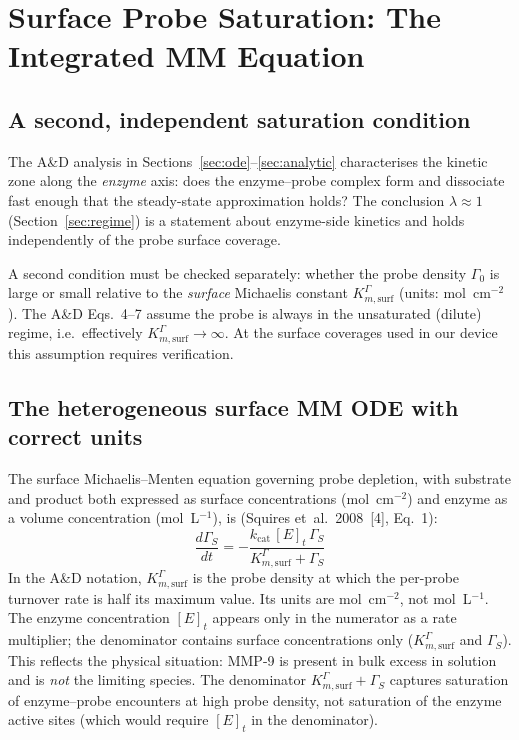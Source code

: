 \documentclass[10pt,a4paper]{article}
\numberwithin{equation}{section}
\newcommand{\cit}[1]{[#1]}
\newcommand{\kcat}{k_{\text{cat}}}
\newcommand{\GS}{\Gamma_S}
\newcommand{\Gz}{\Gamma_0}
\begin{document}
\section{Surface Probe Saturation: The Integrated MM Equation}
\label{sec:surface_sat}

\subsection{A second, independent saturation condition}

The A\&D analysis in Sections~\ref{sec:ode}--\ref{sec:analytic} characterises
the kinetic zone along the \emph{enzyme} axis: does the enzyme--probe complex
form and dissociate fast enough that the steady-state approximation holds?
The conclusion $\lambda \approx 1$ (Section~\ref{sec:regime}) is a statement
about enzyme-side kinetics and holds independently of the probe surface coverage.

A second condition must be checked separately: whether the probe density
$\Gz$ is large or small relative to the \emph{surface} Michaelis constant
$K_{m,\text{surf}}^\Gamma$ (units: mol~cm$^{-2}$). The A\&D Eqs.~4--7 assume
the probe is always in the unsaturated (dilute) regime, i.e.\ effectively
$K_{m,\text{surf}}^\Gamma \to \infty$. At the surface coverages used in our
device this assumption requires verification.

\subsection{The heterogeneous surface MM ODE with correct units}

The surface Michaelis--Menten equation governing probe depletion, with
substrate and product both expressed as surface concentrations
(mol~cm$^{-2}$) and enzyme as a volume concentration (mol~L$^{-1}$), is
(Squires et~al.\ 2008~\cit{4}, Eq.~1):
\begin{equation}
  \frac{d\GS}{dt} = -\frac{\kcat\,[E]_t\,\GS}{K_{m,\text{surf}}^\Gamma + \GS}
  \label{eq:mm_surface}
\end{equation}
In the A\&D notation, $K_{m,\text{surf}}^\Gamma$ is the probe density at
which the per-probe turnover rate is half its maximum value. Its units are
mol~cm$^{-2}$, not mol~L$^{-1}$.
The enzyme concentration $[E]_t$ appears only in the numerator as a rate
multiplier; the denominator contains surface concentrations only ($K_{m,\text{surf}}^\Gamma$
and $\GS$). This reflects the physical situation: MMP-9 is present in bulk excess
in solution and is \emph{not} the limiting species. The denominator $K_{m,\text{surf}}^\Gamma + \GS$
captures saturation of enzyme--probe encounters at high probe density, not
saturation of the enzyme active sites (which would require $[E]_t$ in the
denominator).
\end{document}
